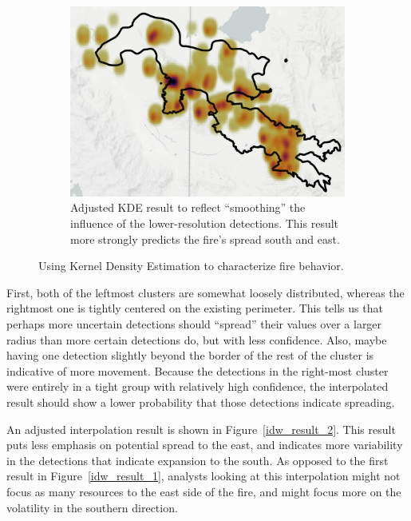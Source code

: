 \begin{figure}[h!]
    \begin{subfigure}[c]{0.48\textwidth}
    \centering
    \includegraphics[width=\textwidth]{images/remote_sensing/adjusted_next.png}
    \caption{Adjusted KDE result to reflect ``smoothing'' the influence of the lower-resolution detections. This result more strongly predicts the fire's spread south and east.}
    \label{kde_b}
    \end{subfigure}
    \caption{Using Kernel Density Estimation to characterize fire behavior.}
\end{figure}

First, both of the leftmost clusters are somewhat loosely distributed, whereas the rightmost one is tightly centered on the existing perimeter. This tells us that perhaps more uncertain detections should ``spread'' their values over a larger radius than more certain detections do, but with less confidence. Also, maybe having one detection slightly beyond the border of the rest of the cluster is indicative of more movement. Because the detections in the right-most cluster were entirely in a tight group with relatively high confidence, the interpolated result should show a lower probability that those detections indicate spreading.

An adjusted interpolation result is shown in Figure~\ref{idw_result_2}. This result puts less emphasis on potential spread to the east, and indicates more variability in the detections that indicate expansion to the south. As opposed to the first result in Figure~\ref{idw_result_1}, analysts looking at this interpolation might not focus as many resources to the east side of the fire, and might focus more on the volatility in the southern direction.

